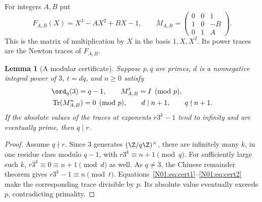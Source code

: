 \documentclass[11pt,a4paper]{article}
\newtheorem{lemma}[theorem]{Lemma}\newtheorem{proposition}[theorem]{Proposition}
\theoremstyle{definition}\newtheorem{definition}[theorem]{Definition}
\theoremstyle{remark}\newtheorem{remark}[theorem]{Remark}
\DeclareMathOperator{\Tr}{Tr}\DeclareMathOperator{\tr}{tr}\DeclareMathOperator{\Nm}{N}
\begin{document}
For integers $A,B$ put
\[
 F_{A,B}(X)=X^3-AX^2+BX-1,\qquad
 M_{A,B}=\begin{pmatrix}0&0&1\\1&0&-B\\0&1&A\end{pmatrix}.
\]
This is the matrix of multiplication by $X$ in the basis $1,X,X^2$.
Its power traces are the Newton traces of $F_{A,B}$.

\begin{lemma}[A modular certificate]\label{N01:lem:certificate}
Suppose $p,q$ are primes, $d$ is a nonnegative integral power of $3$,
$t=dq$, and $n\ge0$ satisfy
\begin{align}
 &\ord_q(3)=q-1,\qquad M_{A,B}^{t}=I\pmod p,\label{N01:eq:cert1}\\
 &\Tr(M_{A,B}^{n})=0\pmod p,\qquad d\mid n+1,
 \qquad q\nmid n+1.\label{N01:eq:cert2}
\end{align}
If the absolute values of the traces at exponents $r3^k-1$ tend to
infinity and are eventually prime, then $q\mid r$.
\end{lemma}
\begin{proof}
Assume $q\nmid r$. Since $3$ generates $(\Z/q\Z)^\times$, there are
infinitely many $k$, in one residue class modulo $q-1$, with
$r3^k\equiv n+1\pmod q$. For sufficiently large such $k$,
$r3^k\equiv0\equiv n+1\pmod d$ as well. As $q\ne3$,
the Chinese remainder theorem gives $r3^k-1\equiv n\pmod t$.
Equations~\eqref{N01:eq:cert1}--\eqref{N01:eq:cert2} make the corresponding
trace divisible by $p$. Its absolute value eventually exceeds $p$,
contradicting primality.
\end{proof}
\end{document}
